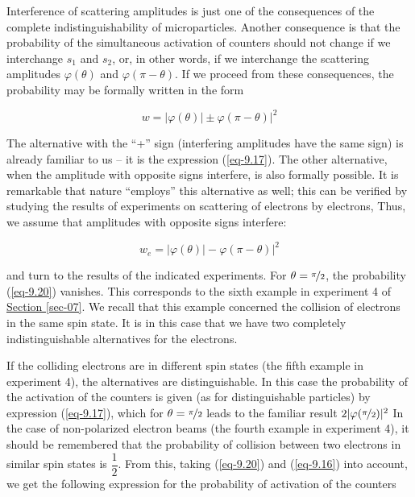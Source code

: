 \documentclass[a4paper,sfsidenotes,colorlinks=true]{tufte-book}
\numberwithin{equation}{section}
\numberwithin{figure}{section}
\begin{document}
Interference of scattering amplitudes is just one of the consequences
of the complete indistinguishability of microparticles. Another
consequence is that the probability of the simultaneous activation of
counters should not change if we interchange $s_{1}$ and $s_{2}$, or,
in other words, if we interchange the scattering amplitudes
$\varphi(\theta)$ and $\varphi(\pi - \theta)$. If we proceed from these consequences, the probability may be formally written in the form

\begin{equation}%
w = |\varphi (\theta)| \pm \varphi (\pi - \theta)|^{2}
\label{eq-9.19}
\end{equation}

The alternative with the ``+'' sign (interfering amplitudes have the
same sign) is already familiar to us -- it is the expression (\ref{eq-9.17}). The other alternative, when the amplitude with opposite signs interfere, is also formally possible. It is remarkable that nature ``employs'' this alternative as well; this can be verified by studying the results of experiments on scattering of electrons by electrons, Thus, we assume that amplitudes with opposite signs interfere:

\begin{equation}%
w_{e} = |\varphi (\theta)| - \varphi (\pi - \theta)|^{2}
\label{eq-9.20}
\end{equation}


and turn to the results of the indicated experiments. For $\theta =
\nicefrac{\pi}{2}$, the probability (\ref{eq-9.20}) vanishes. This
corresponds to the sixth example in experiment 4 of
\hyperref[sec-07]{Section \ref{sec-07}}. We recall that this example
concerned the collision of electrons in the same spin state. It is in
this case that we have two completely indistinguishable alternatives
for the electrons.


If the colliding electrons are in different spin states (the fifth
example in experiment 4), the alternatives are distinguishable. In
this case the probability of the activation of the counters is given
(as for distinguishable particles) by expression (\ref{eq-9.17}),
which for $\theta = \nicefrac{\pi}{2}$ leads to the familiar result $2
| \varphi (\nicefrac{\pi}{2}) |^{2}$ In the case of non-polarized
electron beams (the fourth example in experiment 4), it should be
remembered that the probability of collision between two electrons in
similar spin states is $\dfrac{1}{2}$. From this, taking
(\ref{eq-9.20}) and (\ref{eq-9.16}) into account, we get the following
expression for the probability of activation of the counters
\end{document}
